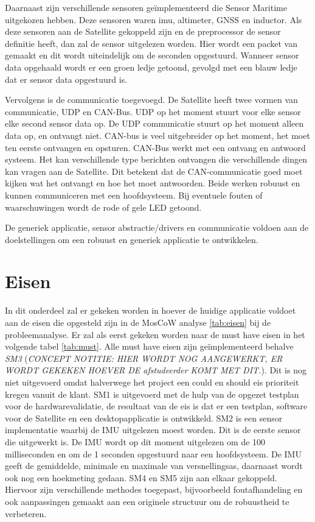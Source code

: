 \noindent Daarnaast zijn verschillende sensoren geïmplementeerd die Sensor Maritime uitgekozen hebben. Deze sensoren waren imu, altimeter, GNSS en inductor. Als deze sensoren aan de Satellite gekoppeld zijn en de preprocessor de sensor definitie heeft, dan zal de sensor uitgelezen worden. Hier wordt een packet van gemaakt en dit wordt uiteindelijk om de seconden opgestuurd. Wanneer sensor data opgehaald wordt er een groen ledje getoond, gevolgd met een blauw ledje dat er sensor data opgestuurd is. \newline

\noindent Vervolgens is de communicatie toegevoegd. De Satellite heeft twee vormen van communicatie, UDP en CAN-Bus. UDP op het moment stuurt voor elke sensor elke second sensor data op. De UDP communicatie stuurt op het moment alleen data op, en ontvangt niet. CAN-bus is veel uitgebreider op het moment, het moet ten eerste ontvangen en opsturen. CAN-Bus werkt met een ontvang en antwoord systeem. Het kan verschillende type berichten ontvangen die verschillende dingen kan vragen aan de Satellite. Dit betekent dat de CAN-communicatie goed moet kijken wat het ontvangt en hoe het moet antwoorden. Beide werken robuust en kunnen communiceren met een hoofdsysteem. Bij eventuele fouten of waarschuwingen wordt de rode of gele LED getoond. \newline

\noindent De generiek applicatie, sensor abstractie/drivers en communicatie voldoen aan de doelstellingen om een robuust en generiek applicatie te ontwikkelen.

\newpage
\section{Eisen}
In dit onderdeel zal er gekeken worden in hoever de huidige applicatie voldoet aan de eisen die opgesteld zijn in de MosCoW analyse \ref{tab:eisen} bij de probleemanalyse. Er zal als eerst gekeken worden naar de must have eisen in het volgende tabel \ref{tab:must}. Alle must have eisen zijn geïmplementeerd behalve \textit{SM3} (\textit{CONCEPT NOTITIE: HIER WORDT NOG AANGEWERKT, ER WORDT GEKEKEN HOEVER DE afstudeerder KOMT MET DIT.}). Dit is nog niet uitgevoerd omdat halverwege het project een could en should eis prioriteit kregen vanuit de klant. SM1 is uitgevoerd met de hulp van de opgezet testplan voor de hardwarevalidatie, de resultaat van de eis is dat er een testplan, software voor de Satellite en een desktopapplicatie is ontwikkeld. SM2 is een sensor implementatie waarbij de IMU uitgelezen moest worden. Dit is de eerste sensor die uitgewerkt is. De IMU wordt op dit moment uitgelezen om de 100 milliseconden en om de 1 seconden opgestuurd naar een hoofdsysteem. De IMU geeft de gemiddelde, minimale en maximale van versnellingsas, daarnaast wordt ook nog een hoekmeting gedaan. SM4 en SM5 zijn aan elkaar gekoppeld. Hiervoor zijn verschillende methodes toegepast, bijvoorbeeld foutafhandeling en ook aanpassingen gemaakt aan een originele structuur om de robuustheid te verbeteren. 

